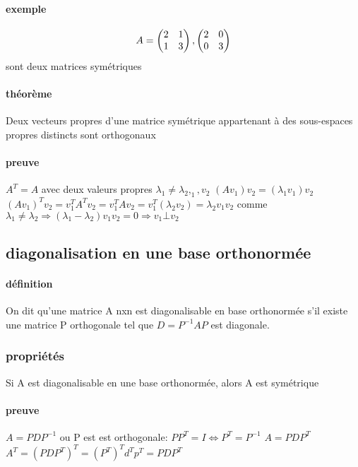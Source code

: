 \documentclass[a4paper,10pt]{article}
\begin{document}
\paragraph{exemple}
\[
A=\begin{pmatrix}
   2&1\cr
   1&3\cr
  \end{pmatrix}
  ,
  \begin{pmatrix}
   2&0\cr
   0&3\cr
  \end{pmatrix}
\]
\newline
sont deux matrices symétriques
\paragraph{théorème}
Deux vecteurs propres d'une matrice symétrique appartenant à des sous-espaces propres distincts sont orthogonaux
\paragraph{preuve}
$A^T=A$ avec deux valeurs propres $\lambda_1\neq\lambda_2, _1,v_2$
\newline
$(Av_1)v_2=(\lambda_1v_1)v_2$
\newline
$(Av_1)^Tv_2=v_1^TA^Tv_2=v_1^TAv_2=v_1^T(\lambda_2v_2)=\lambda_2v_1v_2$
\newline
comme $\lambda_1\neq \lambda_2\Rightarrow (\lambda_1-\lambda_2)v_1v_2=0\Rightarrow v_1\bot v_2$
\subsection{diagonalisation en une base orthonormée}
\paragraph{définition}
On dit qu'une matrice A nxn est diagonalisable en base orthonormée s'il existe une matrice P orthogonale tel que $D=P^{-1}AP$ est diagonale.
\subsubsection{propriétés}
Si A est diagonalisable en une base orthonormée, alors A est symétrique
\paragraph{preuve}
$A=PDP^{-1}$ ou P est est orthogonale: $PP^T=I\Leftrightarrow P^T=P^{-1}$
\newline
$A=PDP^T$
\newline
$A^T=(PDP^T)^T=(P^T)^Td^Tp^T=PDP^T$
\end{document}
